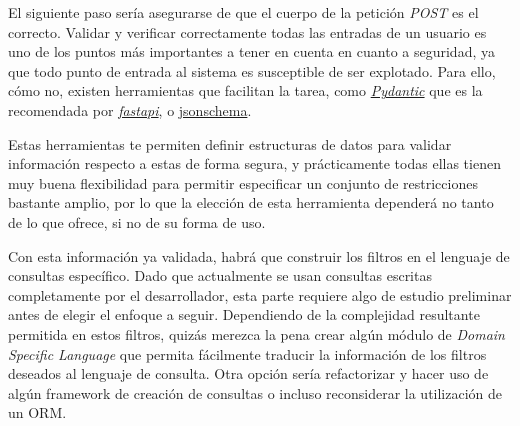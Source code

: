 El siguiente paso sería asegurarse de que el cuerpo de la petición \textit{POST} es el correcto. Validar y verificar correctamente todas las entradas de un usuario es uno de los puntos más importantes a tener en cuenta en cuanto a seguridad, ya que todo punto de entrada al sistema es susceptible de ser explotado. Para ello, cómo no, existen herramientas que facilitan la tarea, como \href{https://docs.pydantic.dev/latest/}{\textit{Pydantic}} que es la recomendada por \href{https://fastapi.tiangolo.com/tutorial/body/}{\textit{fastapi}}, o \href{https://python-jsonschema.readthedocs.io/en/stable/}{jsonschema}. 

Estas herramientas te permiten definir estructuras de datos para validar información respecto a estas de forma segura, y prácticamente todas ellas tienen muy buena flexibilidad para permitir especificar un conjunto de restricciones bastante amplio, por lo que la elección de esta herramienta dependerá no tanto de lo que ofrece, si no de su forma de uso.

Con esta información ya validada, habrá que construir los filtros en el lenguaje de consultas específico. Dado que actualmente se usan consultas escritas completamente por el desarrollador, esta parte requiere algo de estudio preliminar antes de elegir el enfoque a seguir. Dependiendo de la complejidad resultante permitida en estos filtros, quizás merezca la pena crear algún módulo de \textit{Domain Specific Language} que permita fácilmente traducir la información de los filtros deseados al lenguaje de consulta. Otra opción sería refactorizar y hacer uso de algún framework de creación de consultas o incluso reconsiderar la utilización de un ORM.

